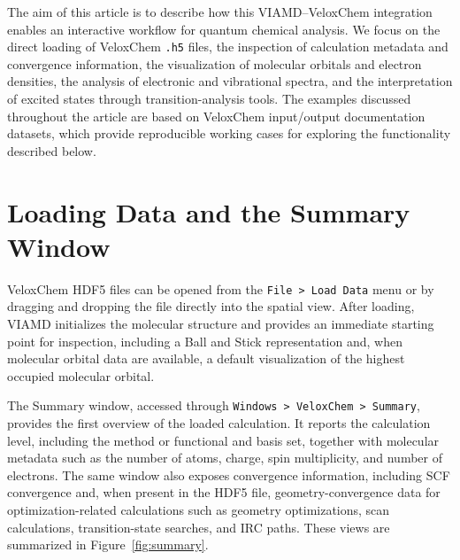 \documentclass[journal=jacsat,manuscript=article]{achemso}
\begin{document}
The aim of this article is to describe how this VIAMD--VeloxChem integration enables an interactive workflow for quantum chemical analysis. We focus on the direct loading of VeloxChem \texttt{.h5} files, the inspection of calculation metadata and convergence information, the visualization of molecular orbitals and electron densities, the analysis of electronic and vibrational spectra, and the interpretation of excited states through transition-analysis tools. The examples discussed throughout the article are based on VeloxChem input/output documentation datasets, which provide reproducible working cases for exploring the functionality described below.


\section{Loading Data and the Summary Window}
VeloxChem HDF5 files can be opened from the \texttt{File > Load Data} menu or by dragging and dropping the file directly into the spatial view. After loading, VIAMD initializes the molecular structure and provides an immediate starting point for inspection, including a Ball and Stick representation and, when molecular orbital data are available, a default visualization of the highest occupied molecular orbital.

The Summary window, accessed through \texttt{Windows > VeloxChem > Summary}, provides the first overview of the loaded calculation. It reports the calculation level, including the method or functional and basis set, together with molecular metadata such as the number of atoms, charge, spin multiplicity, and number of electrons. The same window also exposes convergence information, including SCF convergence and, when present in the HDF5 file, geometry-convergence data for optimization-related calculations such as geometry optimizations, scan calculations, transition-state searches, and IRC paths. These views are summarized in Figure~\ref{fig:summary}.
\end{document}
